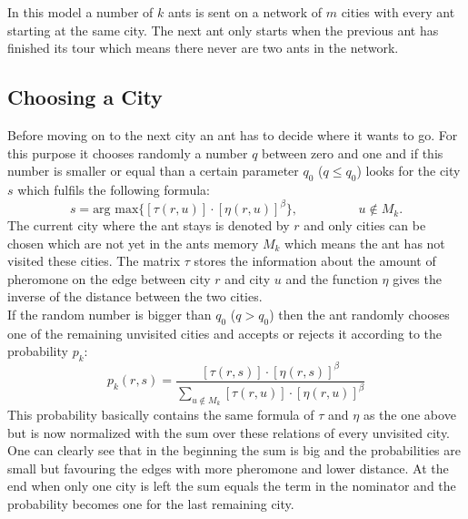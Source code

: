 In this model a number of $k$ ants is sent on a network of $m$ cities with every ant starting at the same city. The next ant only starts when the previous ant has finished its tour which means there never are two ants in the network. \\
\subsection{Choosing a City}
Before moving on to the next city an ant has to decide where it wants to go. For this purpose it chooses randomly a number $q$ between zero and one and if this number is smaller or equal than a certain parameter $q_0$ ($q \leqslant q_0$) looks for the city $s$ which fulfils the following formula:
\begin{equation}
s = \text{arg max}\{[\tau (r,u)] \cdot [\eta (r,u)]^{\beta}\}, \hspace{2cm} u \not\in M_k.
\label{eq:qsmallerq0}
\end{equation}
The current city where the ant stays is denoted by $r$ and only cities can be chosen which are not yet in the ants memory $M_k$ which means the ant has not visited these cities. The matrix $\tau$ stores the information about the amount of pheromone on the edge between city $r$ and city $u$ and the function $\eta$ gives the inverse of the distance between the two cities. \\
If the random number is bigger than $q_0$ ($q > q_0$) then the ant randomly chooses one of the remaining unvisited cities and accepts or rejects it according to the probability $p_k$:
\begin{equation}
p_k (r,s) = \frac{[\tau (r,s)] \cdot [\eta (r,s)]^{\beta}}{\sum_{u \not\in M_k}[\tau (r,u)] \cdot [\eta (r,u)]^{\beta}}
\label{eq:prob}
\end{equation}
This probability basically contains the same formula of $\tau$ and $\eta$ as the one above but is now normalized with the sum over these relations of every unvisited city. One can clearly see that in the beginning the sum is big and the probabilities are small but favouring the edges with more pheromone and lower distance. At the end when only one city is left the sum equals the term in the nominator and the probability becomes one for the last remaining city.
